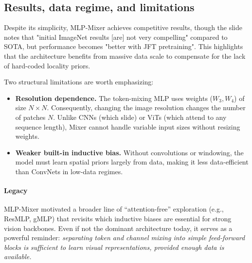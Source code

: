 \subsection{Results, data regime, and limitations}
\noindent
Despite its simplicity, MLP-Mixer achieves competitive results, though the slide notes that "initial ImageNet results [are] not very compelling" compared to SOTA, but performance becomes "better with JFT pretraining". This highlights that the architecture benefits from massive data scale to compensate for the lack of hard-coded locality priors.

\noindent
Two structural limitations are worth emphasizing:
\begin{itemize}
	\item \textbf{Resolution dependence.}
	The token-mixing MLP uses weights ($W_3, W_4$) of size $N \times N$.
	Consequently, changing the image resolution changes the number of patches $N$. Unlike CNNs (which slide) or ViTs (which attend to any sequence length), Mixer cannot handle variable input sizes without resizing weights.
	\item \textbf{Weaker built-in inductive bias.}
	Without convolutions or windowing, the model must learn spatial priors largely from data, making it less data-efficient than ConvNets in low-data regimes.
\end{itemize}

\paragraph{Legacy}
\noindent
MLP-Mixer motivated a broader line of ``attention-free'' exploration (e.g., ResMLP, gMLP) that revisits which inductive biases are essential for strong vision backbones.
Even if not the dominant architecture today, it serves as a powerful reminder:
\emph{separating token and channel mixing into simple feed-forward blocks is sufficient to learn visual representations, provided enough data is available.}